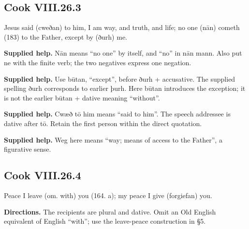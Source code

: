 \par\begin{minipage}{\linewidth}\raggedright
\subsection*{Cook VIII.26.3}

Jesus said (cweðan) to him, I am way, and truth, and life; no one (nān) cometh (183) to the Father, except by (ðurh) me.

\textbf{Supplied help.} Nān means “no one” by itself, and “no” in nān mann. Also put ne with the finite verb; the two negatives express one negation.

\end{minipage}\par\addvspace{4pt}

\textbf{Supplied help.} Use būtan, “except”, before ðurh + accusative. The supplied spelling ðurh corresponds to earlier þurh. Here būtan introduces the exception; it is not the earlier būtan + dative meaning “without”.

\textbf{Supplied help.} Cwæð tō him means “said to him”. The speech addressee is dative after tō. Retain the first person within the direct quotation.

\textbf{Supplied help.} Weg here means “way; means of access to the Father”, a figurative sense.

\par\begin{minipage}{\linewidth}\raggedright
\subsection*{Cook VIII.26.4}

Peace I leave (om. with) you (164. a); my peace I give (forgiefan) you.

\textbf{Directions.} The recipients are plural and dative. Omit an Old English equivalent of English “with”; use the leave-peace construction in §5.

\end{minipage}\par\addvspace{4pt}

